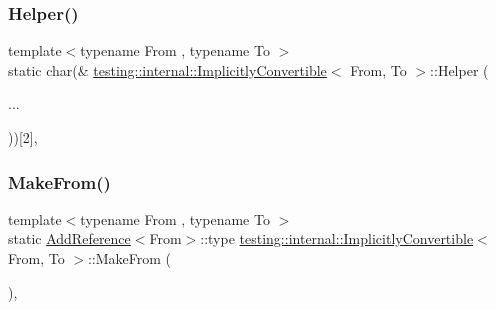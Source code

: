 \mbox{\label{classtesting_1_1internal_1_1ImplicitlyConvertible_aba219f30a4cbba407d8141ce53fbfeb7}} 
\subsubsection{\texorpdfstring{Helper()}{Helper()}\hspace{0.1cm}{\footnotesize\ttfamily [2/2]}}
{\footnotesize\ttfamily template$<$typename From , typename To $>$ \\
static char(\& \hyperlink{classtesting_1_1internal_1_1ImplicitlyConvertible}{testing\+::internal\+::\+Implicitly\+Convertible}$<$ From, To $>$\+::Helper (\begin{DoxyParamCaption}\item[{}]{... }\end{DoxyParamCaption}))\mbox{[}2\mbox{]}\hspace{0.3cm}{\ttfamily [static]}, {\ttfamily [private]}}

\mbox{\label{classtesting_1_1internal_1_1ImplicitlyConvertible_adb692b091aebd0cde316c8c2c0ab661f}} 
\subsubsection{\texorpdfstring{Make\+From()}{MakeFrom()}}
{\footnotesize\ttfamily template$<$typename From , typename To $>$ \\
static \hyperlink{structtesting_1_1internal_1_1AddReference}{Add\+Reference}$<$From$>$\+::type \hyperlink{classtesting_1_1internal_1_1ImplicitlyConvertible}{testing\+::internal\+::\+Implicitly\+Convertible}$<$ From, To $>$\+::Make\+From (\begin{DoxyParamCaption}{ }\end{DoxyParamCaption})\hspace{0.3cm}{\ttfamily [static]}, {\ttfamily [private]}}




